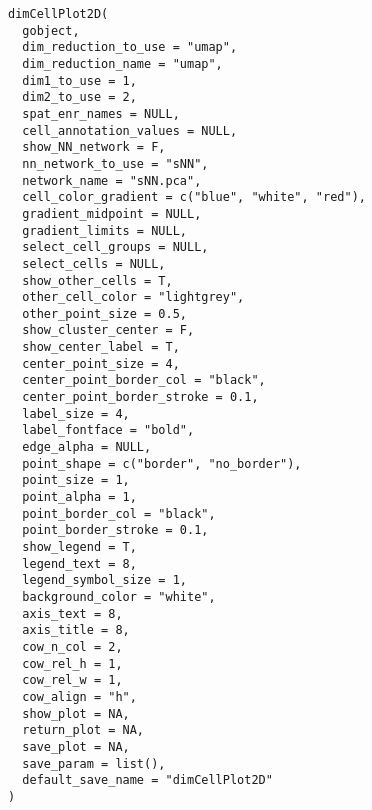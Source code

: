 \documentclass[a4paper]{book}
\begin{document}
\begin{Usage}
\begin{verbatim}
dimCellPlot2D(
  gobject,
  dim_reduction_to_use = "umap",
  dim_reduction_name = "umap",
  dim1_to_use = 1,
  dim2_to_use = 2,
  spat_enr_names = NULL,
  cell_annotation_values = NULL,
  show_NN_network = F,
  nn_network_to_use = "sNN",
  network_name = "sNN.pca",
  cell_color_gradient = c("blue", "white", "red"),
  gradient_midpoint = NULL,
  gradient_limits = NULL,
  select_cell_groups = NULL,
  select_cells = NULL,
  show_other_cells = T,
  other_cell_color = "lightgrey",
  other_point_size = 0.5,
  show_cluster_center = F,
  show_center_label = T,
  center_point_size = 4,
  center_point_border_col = "black",
  center_point_border_stroke = 0.1,
  label_size = 4,
  label_fontface = "bold",
  edge_alpha = NULL,
  point_shape = c("border", "no_border"),
  point_size = 1,
  point_alpha = 1,
  point_border_col = "black",
  point_border_stroke = 0.1,
  show_legend = T,
  legend_text = 8,
  legend_symbol_size = 1,
  background_color = "white",
  axis_text = 8,
  axis_title = 8,
  cow_n_col = 2,
  cow_rel_h = 1,
  cow_rel_w = 1,
  cow_align = "h",
  show_plot = NA,
  return_plot = NA,
  save_plot = NA,
  save_param = list(),
  default_save_name = "dimCellPlot2D"
)
\end{verbatim}
\end{Usage}
%
\end{document}
